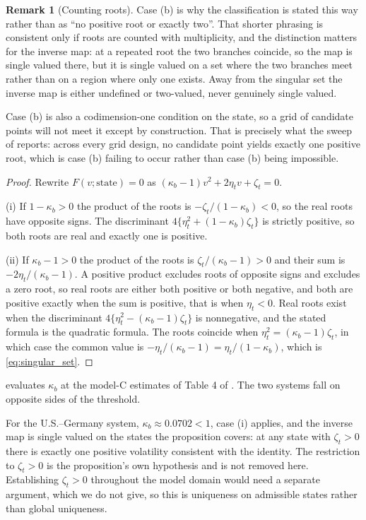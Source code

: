 \documentclass[11pt]{article}
\theoremstyle{definition}
\newtheorem{remark}[remark]{Remark}
\begin{document}
\begin{remark}[Counting roots]\label{rem:root_counting}
Case (b) is why the classification is stated this way rather than as ``no positive root or exactly two''. That shorter phrasing is consistent only if roots are counted with multiplicity, and the distinction matters for the inverse map: at a repeated root the two branches coincide, so the map is single valued there, but it is single valued on a set where the two branches meet rather than on a region where only one exists. Away from the singular set the inverse map is either undefined or two-valued, never genuinely single valued.

Case (b) is also a codimension-one condition on the state, so a grid of candidate points will not meet it except by construction. That is precisely what the sweep of  reports: across every grid design, no candidate point yields exactly one positive root, which is case (b) failing to occur rather than case (b) being impossible.
\end{remark}

\begin{proof}
Rewrite $F(v;\text{state})=0$ as $(\kappa_b-1)v^2+2\eta_tv+\zeta_t=0$.

(i) If $1-\kappa_b>0$ the product of the roots is $-\zeta_t/(1-\kappa_b)<0$, so the real roots have opposite signs. The discriminant $4\{\eta_t^2+(1-\kappa_b)\zeta_t\}$ is strictly positive, so both roots are real and exactly one is positive.

(ii) If $\kappa_b-1>0$ the product of the roots is $\zeta_t/(\kappa_b-1)>0$ and their sum is $-2\eta_t/(\kappa_b-1)$. A positive product excludes roots of opposite signs and excludes a zero root, so real roots are either both positive or both negative, and both are positive exactly when the sum is positive, that is when $\eta_t<0$. Real roots exist when the discriminant $4\{\eta_t^2-(\kappa_b-1)\zeta_t\}$ is nonnegative, and the stated formula is the quadratic formula. The roots coincide when $\eta_t^2=(\kappa_b-1)\zeta_t$, in which case the common value is $-\eta_t/(\kappa_b-1)=\eta_t/(1-\kappa_b)$, which is \eqref{eq:singular_set}.
\end{proof}

 evaluates $\kappa_b$ at the model-C estimates of Table 4 of \citet{BrandtSantaClara2002}. The two systems fall on opposite sides of the threshold.

For the U.S.--Germany system, $\kappa_b\approx0.0702<1$, case (i) applies, and the inverse map is single valued on the states the proposition covers: at any state with $\zeta_t>0$ there is exactly one positive volatility consistent with the identity. The restriction to $\zeta_t>0$ is the proposition's own hypothesis and is not removed here. Establishing $\zeta_t>0$ throughout the model domain would need a separate argument, which we do not give, so this is uniqueness on admissible states rather than global uniqueness.
\end{document}
